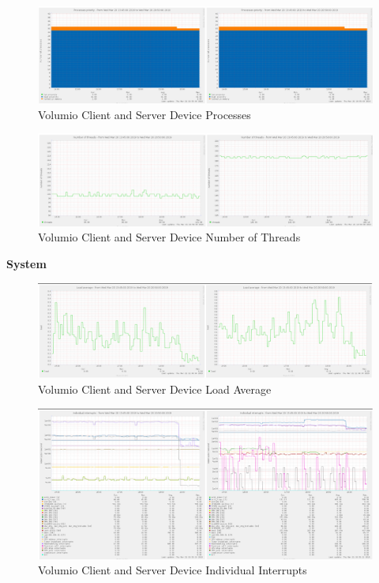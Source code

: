 \documentclass[11pt,a4paper,headinclude=false,footinclude=false]{scrreprt}
\begin{document}
\begin{figure}[H]
\includegraphics{ResultsAndAnalysis/VolumioServerTestImages/021VolumioProcessPriority.png}
\centering
\caption{Volumio Client and Server Device Processes}
\label{VolumioProcessPriority}
\end{figure}

\begin{figure}[H]
\includegraphics{ResultsAndAnalysis/VolumioServerTestImages/019VolumioNoOfThreads.png}
\centering
\caption{Volumio Client and Server Device Number of Threads}
\label{VolumioNumThreads}
\end{figure}

\textbf{System}

\begin{figure}[H]
\includegraphics{ResultsAndAnalysis/VolumioServerTestImages/016VolumioLoadAverage.png}
\centering
\caption{Volumio Client and Server Device Load Average}
\label{VolumioLoadAvg}
\end{figure}

\begin{figure}[H]
\includegraphics{ResultsAndAnalysis/VolumioServerTestImages/014VolumioIndividualInterrupts.png}
\centering
\caption{Volumio Client and Server Device Individual Interrupts}
\label{VolumioIndInt}
\end{figure}
\end{document}
